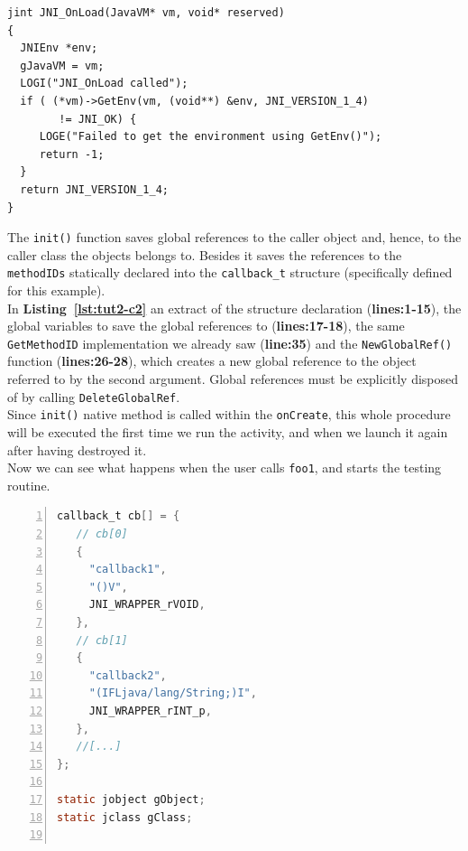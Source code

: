 \documentclass[a4paper,10pt]{article}
\newcommand{\keyword}[1]{\texttt{#1}}
\newcommand{\refl}[1]{\textbf{Listing~\ref{#1}}}
\begin{document}
\begin{multicols}{2}
\begin{lstlisting}
jint JNI_OnLoad(JavaVM* vm, void* reserved)
{
  JNIEnv *env;
  gJavaVM = vm;
  LOGI("JNI_OnLoad called");
  if ( (*vm)->GetEnv(vm, (void**) &env, JNI_VERSION_1_4)
  		!= JNI_OK) {
     LOGE("Failed to get the environment using GetEnv()");
     return -1;
  }
  return JNI_VERSION_1_4;
}
\end{lstlisting}
The \keyword{init()} function saves global references to the caller object and,
hence, to the caller class the objects belongs to. Besides it saves the
references to the \keyword{methodIDs} statically declared into the
\keyword{callback\_t} structure (specifically defined for this example).\\
In \refl{lst:tut2-c2} an extract of the structure declaration
(\textbf{lines:1-15}), the global variables to save the global references to
(\textbf{lines:17-18}), the same \keyword{GetMethodID} implementation we already
saw (\textbf{line:35}) and the \keyword{NewGlobalRef()} function
(\textbf{lines:26-28}), which creates a new global reference to the object
referred to by the second argument. Global references must be explicitly
disposed of by calling \keyword{DeleteGlobalRef}.\\
Since \keyword{init()} native method is called within the \keyword{onCreate},
this whole procedure will be executed the first time we run the activity, and
when we launch it again after having destroyed it.\\
Now we can see what happens when the user calls \keyword{foo1}, and starts the
testing routine.
\begin{lstlisting}[language=C,
		   columns=fullflexible,
		   showstringspaces=false,
		   xleftmargin=15pt,
		   frame = l,
		   numbers=left,
		   commentstyle=\color{gray}\upshape,
		   caption=Part of tutorial2.c - init(),
		   label=lst:tut2-c2]
callback_t cb[] = {
   // cb[0]
   {
     "callback1",
     "()V",
     JNI_WRAPPER_rVOID,
   },
   // cb[1]
   {
     "callback2",
     "(IFLjava/lang/String;)I",
     JNI_WRAPPER_rINT_p,
   },
   //[...]
};

static jobject gObject;
static jclass gClass;


\end{lstlisting}
\end{multicols}
\end{document}

